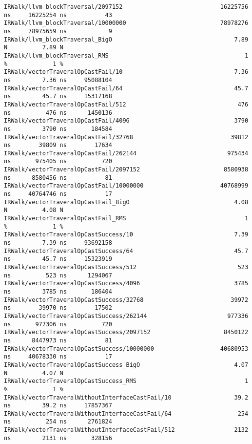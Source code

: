 \begin{code}
\begin{verbatim}
IRWalk/llvm_blockTraversal/2097152                            16225756 ns     16225254 ns           43
IRWalk/llvm_blockTraversal/10000000                           78978276 ns     78975659 ns            9
IRWalk/llvm_blockTraversal_BigO                                   7.89 N          7.89 N
IRWalk/llvm_blockTraversal_RMS                                       1 %             1 %
IRWalk/vectorTraveralOpCastFail/10                                7.36 ns         7.36 ns     95088104
IRWalk/vectorTraveralOpCastFail/64                                45.7 ns         45.7 ns     15317168
IRWalk/vectorTraveralOpCastFail/512                                476 ns          476 ns      1450136
IRWalk/vectorTraveralOpCastFail/4096                              3790 ns         3790 ns       184584
IRWalk/vectorTraveralOpCastFail/32768                            39812 ns        39809 ns        17634
IRWalk/vectorTraveralOpCastFail/262144                          975434 ns       975405 ns          720
IRWalk/vectorTraveralOpCastFail/2097152                        8580938 ns      8580456 ns           81
IRWalk/vectorTraveralOpCastFail/10000000                      40768999 ns     40764746 ns           17
IRWalk/vectorTraveralOpCastFail_BigO                              4.08 N          4.08 N
IRWalk/vectorTraveralOpCastFail_RMS                                  1 %             1 %
IRWalk/vectorTraveralOpCastSuccess/10                             7.39 ns         7.39 ns     93692158
IRWalk/vectorTraveralOpCastSuccess/64                             45.7 ns         45.7 ns     15323919
IRWalk/vectorTraveralOpCastSuccess/512                             523 ns          523 ns      1294067
IRWalk/vectorTraveralOpCastSuccess/4096                           3785 ns         3785 ns       186404
IRWalk/vectorTraveralOpCastSuccess/32768                         39972 ns        39970 ns        17502
IRWalk/vectorTraveralOpCastSuccess/262144                       977336 ns       977306 ns          720
IRWalk/vectorTraveralOpCastSuccess/2097152                     8450122 ns      8447973 ns           81
IRWalk/vectorTraveralOpCastSuccess/10000000                   40680953 ns     40678330 ns           17
IRWalk/vectorTraveralOpCastSuccess_BigO                           4.07 N          4.07 N
IRWalk/vectorTraveralOpCastSuccess_RMS                               1 %             1 %
IRWalk/vectorTraveralWithoutInterfaceCastFail/10                  39.2 ns         39.2 ns     17857367
IRWalk/vectorTraveralWithoutInterfaceCastFail/64                   254 ns          254 ns      2761824
IRWalk/vectorTraveralWithoutInterfaceCastFail/512                 2132 ns         2131 ns       328156

\end{verbatim}
\end{code}
